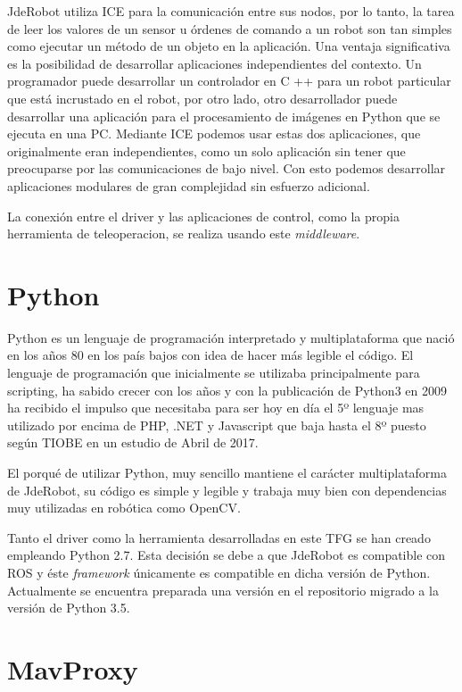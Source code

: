 JdeRobot utiliza ICE para la comunicación entre sus nodos, por lo tanto, la tarea de leer
los valores de un sensor u órdenes de comando a un robot son tan simples como ejecutar un método de un objeto en la aplicación. Una ventaja significativa es la posibilidad de desarrollar aplicaciones independientes del contexto. Un programador puede desarrollar un controlador en C ++ para un robot particular que está incrustado en el robot, por otro lado, otro desarrollador puede desarrollar una aplicación para el procesamiento de imágenes en Python que se ejecuta en una PC. Mediante ICE podemos usar estas dos aplicaciones, que originalmente eran independientes, como un solo aplicación sin tener que preocuparse por las comunicaciones de bajo nivel. Con esto podemos desarrollar aplicaciones modulares de gran complejidad sin esfuerzo adicional.

La conexión entre el driver y las aplicaciones de control, como la propia herramienta de teleoperacion, se realiza usando este \textit{middleware}.

\section{Python}
\label{sec:python}

Python\cite{python} es un lenguaje de programaci\'on interpretado y multiplataforma que naci\'o en los años 80 en los país bajos con idea de hacer más legible el c\'odigo.
El lenguaje de programaci\'on que inicialmente se utilizaba principalmente para scripting, ha sabido crecer con los años y con la publicaci\'on de Python3 en 2009 ha recibido el impulso que necesitaba para ser hoy en día el 5º lenguaje mas utilizado por encima de PHP, .NET y Javascript que baja hasta el 8º puesto según TIOBE en un estudio de Abril de 2017.

El porqué de utilizar Python, muy sencillo mantiene el carácter multiplataforma de JdeRobot, su c\'odigo es simple y legible y trabaja muy bien con dependencias muy utilizadas en rob\'otica como OpenCV.

Tanto el driver como la herramienta desarrolladas en este TFG se han creado empleando Python 2.7. Esta decisión se debe a que JdeRobot es compatible con ROS y éste \textit{framework} únicamente es compatible en dicha versión de Python. Actualmente se encuentra preparada una versión en el repositorio migrado a la versión de Python 3.5.

\section{MavProxy}
\label{sec:MavProxy}

